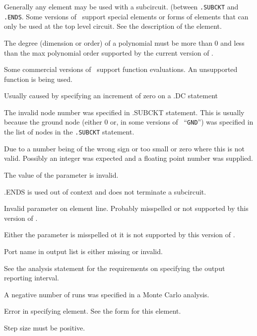 Generally any element may be used with a subcircuit.
(between {\tt .SUBCKT} and {\tt .ENDS}. Some versions of
\justspice\ support special elements or forms of elements that can only be used
at the top level circuit.  See the description of the element.

The degree (dimension or order) of a polynomial must be more
than 0 and less than the max polynomial order supported by the current
version of \spice .

Some commercial versions of \justspice\ support function evaluations. An
unsupported function is being used.

Usually caused by specifying an increment of zero on a .DC statement

The invalid node number was specified in .SUBCKT statement. This is usually
because the ground node (either 0 or, in some versions of \justspice\,
``{\tt GND}'') was specified in the list of nodes in the {\tt .SUBCKT}
statement.

Due to a number being of the wrong sign or too small or zero where this is not valid.
Possibly an integer was expected and a floating point number was supplied.

The value of the parameter is invalid.

.ENDS is used out of context and does not terminate a subcircuit.

Invalid parameter on element line. Probably
misspelled or not supported by this version of \justspice.

Either the parameter is misspelled ot it is not supported by this version of
\justspice.

Port name in output list is either missing or invalid.

See the analysis statement for the requirements on specifying the output
reporting interval.

A negative number of runs was specified in a Monte Carlo analysis.

Error in specifying element. See the form for this element.

Step size must be positive.

